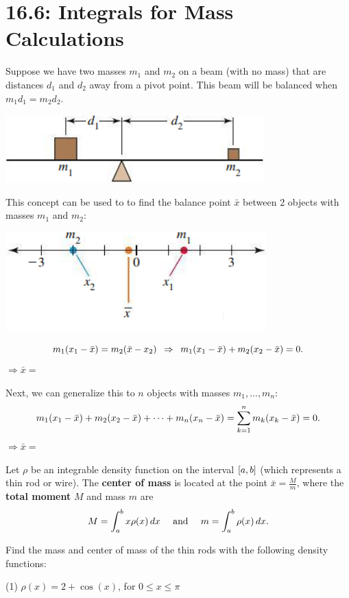 \documentclass[mathNotesPreamble]{subfiles}
\begin{document}
\section{16.6: Integrals for Mass Calculations}
  Suppose we have two masses $m_1$ and $m_2$ on a beam (with no mass) that are distances $d_1$ and $d_2$ away from a pivot point. This beam will be balanced when $m_1d_1=m_2d_2$.
  \vspace*{10pt}
  \begin{center}
    \includegraphics[width=0.45\linewidth]{images/briggs_16_06/fig16_64}
  \end{center}
  \vspace*{10pt}
  This concept can be used to to find the balance point $\bar{x}$ between 2 objects with masses $m_1$ and $m_2$:
  \begin{center}
    \includegraphics[width=0.45\linewidth]{images/briggs_16_06/fig16_65}
  \end{center}
  \[m_1{\left(x_1-\bar{x}\right)}=m_2{\left(\bar{x}-x_2\right)}\hspace*{5pt} \Rightarrow \hspace*{5pt} m_1{\left(x_1-\bar{x}\right)}+m_2{\left(x_2-\bar{x}\right)}=0.\]
  \tab$\Rightarrow \bar{x}=$

  Next, we can generalize this to $n$ objects with masses $m_1,\dots,m_n$:
    \[m_1{\left(x_1-\bar{x}\right)}+m_2{\left(x_2-\bar{x}\right)}+\dots+m_n{\left(x_n-\bar{x}\right)}=\sum_{k=1}^n m_k{\left(x_k-\bar{x}\right)}=0.\]
  \tab$\Rightarrow \bar{x}=$
  \pagebreak


  \begin{defn*}
    Let $\rho$ be an integrable density function on the interval ${\left[a,b\right]}$ (which represents a thin rod or wire). The \textbf{center of mass} is located at the point $\bar{x}=\frac{M}{m}$, where the \textbf{total moment} $M$ and mass $m$ are
      \[M=\int_a^b x\rho(x)\,dx\quad \textnormal{ and }\quad m=\int_a^b \rho(x)\,dx.\]
  \end{defn*}
  \begin{ex*}
    Find the mass and center of mass of the thin rods with the following density functions:
  \end{ex*}
  \begin{tasks}[after-item-skip=\stretch{1}, label=](1)
    \task 
      $\rho(x)=2+\cos(x)$, for $0\leq x\leq \pi$
  \end{tasks}
  \pagebreak
\end{document}
